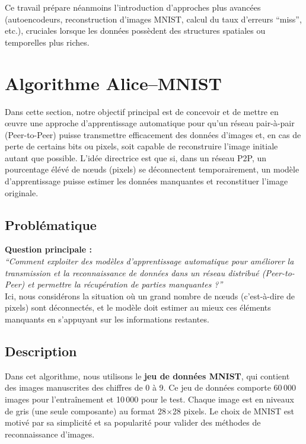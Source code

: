 \documentclass[a4paper,12pt]{article}
\begin{document}
Ce travail prépare néanmoins l’introduction d’approches plus avancées (autoencodeurs, reconstruction d’images MNIST, calcul du taux d’erreurs “miss”, etc.), cruciales lorsque les données possèdent des structures spatiales ou temporelles plus riches.

\section{Algorithme Alice--MNIST}

Dans cette section, notre objectif principal est de concevoir et de mettre en \oe uvre une approche d'apprentissage automatique pour qu'un réseau pair-\`a-pair (Peer-to-Peer) puisse transmettre efficacement des données d'images et, en cas de perte de certains bits ou pixels, soit capable de reconstruire l'image initiale autant que possible. L'id\'ee directrice est que si, dans un r\'eseau P2P, un pourcentage \'el\'ev\'e de n\oe uds (pixels) se d\'econnectent temporairement, un mod\`ele d'apprentissage puisse estimer les donn\'ees manquantes et reconstituer l'image originale.

\subsection{Problématique}
\textbf{Question principale :}\\
\emph{``Comment exploiter des modèles d'apprentissage automatique pour améliorer la transmission et la reconnaissance de données dans un réseau distribué (Peer-to-Peer) et permettre la récupération de parties manquantes ?''}\\

Ici, nous considérons la situation où un grand nombre de n\oe uds (c'est-à-dire de pixels) sont déconnectés, et le modèle doit estimer au mieux ces éléments manquants en s'appuyant sur les informations restantes.

\subsection{Description}
Dans cet algorithme, nous utilisons le \textbf{jeu de données MNIST}, qui contient des images manuscrites des chiffres de 0 à 9. Ce jeu de données comporte 60\,000 images pour l'entraînement et 10\,000 pour le test. Chaque image est en niveaux de gris (une seule composante) au format 28$\times$28 pixels. Le choix de MNIST est motivé par sa simplicité et sa popularité pour valider des méthodes de reconnaissance d'images.
\end{document}
